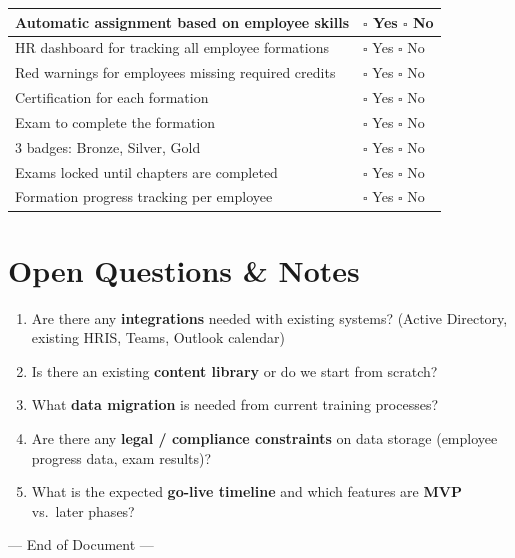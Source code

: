 \documentclass[11pt,a4paper]{article}
\begin{document}
\begin{tabular}{|p{}|p{}|}
\hline
Automatic assignment based on employee skills & \hspace{1em} $\square$ Yes \quad $\square$ No \\
\hline
HR dashboard for tracking all employee formations & \hspace{1em} $\square$ Yes \quad $\square$ No \\
\hline
Red warnings for employees missing required credits & \hspace{1em} $\square$ Yes \quad $\square$ No \\
\hline
Certification for each formation & \hspace{1em} $\square$ Yes \quad $\square$ No \\
\hline
Exam to complete the formation & \hspace{1em} $\square$ Yes \quad $\square$ No \\
\hline
3 badges: Bronze, Silver, Gold & \hspace{1em} $\square$ Yes \quad $\square$ No \\
\hline
Exams locked until chapters are completed & \hspace{1em} $\square$ Yes \quad $\square$ No \\
\hline
Formation progress tracking per employee & \hspace{1em} $\square$ Yes \quad $\square$ No \\
\hline
\end{tabular}

\vspace{2em}

\section{Open Questions \& Notes}

\begin{enumerate}[leftmargin=2em]
  \item Are there any \textbf{integrations} needed with existing systems? (Active Directory, existing HRIS, Teams, Outlook calendar)
  \item Is there an existing \textbf{content library} or do we start from scratch?
  \item What \textbf{data migration} is needed from current training processes?
  \item Are there any \textbf{legal / compliance constraints} on data storage (employee progress data, exam results)?
  \item What is the expected \textbf{go-live timeline} and which features are \textbf{MVP} vs.\ later phases?
\end{enumerate}

\vspace{2em}
\begin{center}
  \color{eygray}\small --- End of Document ---
\end{center}
\end{document}
